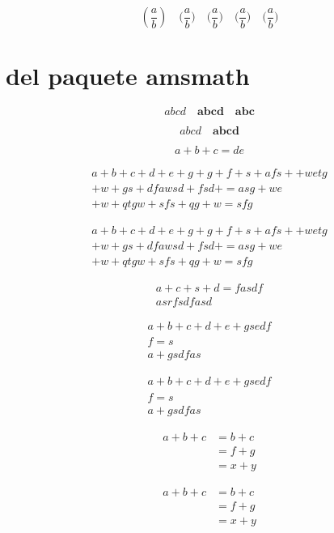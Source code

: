 \documentclass[12pt,a4paper]{report}
\numberwithin{equation}{section}
\begin{document}
$$
(\frac{a}{b})\quad \big(\frac{a}{b}\big)\quad \Big(\frac{a}{b}\Big)\quad \bigg(\frac{a}{b}\bigg)\quad \Bigg(\frac{a}{b}\Bigg)
$$



\newpage


\section{del paquete amsmath}
$$
abcd\quad \boldsymbol{abcd}\quad\mathbf{abc}
$$

$$
abcd\quad \pmb{abcd}
$$

\begin{equation*}
a+b+c=de
\end{equation*}

\begin{multline}
a+b+c+d+e+g+g+f+s+afs++wetg\\+w+gs+dfawsd+fsd+=asg+we\\+w+qtgw+sfs+qg+w=sfg
\end{multline}

\begin{multline*}
a+b+c+d+e+g+g+f+s+afs++wetg\\+w+gs+dfawsd+fsd+=asg+we\\+w+qtgw+sfs+qg+w=sfg
\end{multline*}

\begin{equation}
\begin{split}
a+c+s+d=fasdf \\
asrfsdfasd
\end{split}
\end{equation}

\begin{gather}
a+b+c+d+e +gsedf \\
f=s \\
a+gsdfas
\end{gather}

\begin{gather*}
a+b+c+d+e +gsedf \\
f=s \\
a+gsdfas
\end{gather*}

\begin{align*}
a+b+c & =  b+c \\
      & =  f+g \\
      & =  x+y
\end{align*}

\begin{align}
a+b+c & =  b+c \\
& =  f+g \\
& =  x+y
\end{align}
\end{document}
